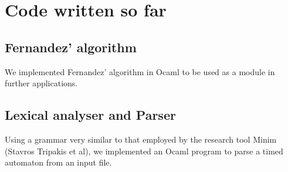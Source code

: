 \documentclass{article}
\begin{document}
\section{Code written so far}

\subsection{Fernandez' algorithm}

We implemented Fernandez' algorithm in Ocaml to be used as a module in
further applications.

\subsection{Lexical analyser and Parser}

Using a grammar very similar to that employed by the research tool Minim (Stavros
Tripakis et al), we implemented an Ocaml program to parse a timed
automaton from an input file.
\end{document}
